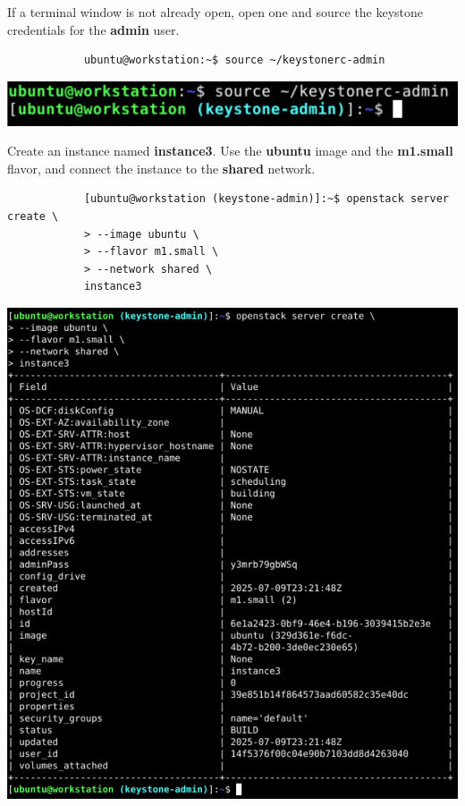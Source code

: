\documentclass[letterpaper, 12pt]{article}
\begin{document}
\begin{enumerate}
    \begin{labstep}
        If a terminal window is not already open, open one and source the keystone credentials for the \textbf{admin} user.
        \begin{lstlisting}
            ubuntu@workstation:~$ source ~/keystonerc-admin
        \end{lstlisting}

        \begin{center}
            \includegraphics[width=\linewidth]{images/part3/step1.png}
        \end{center}
    \end{labstep}

    \begin{labstep}
        Create an instance named \textbf{instance3}.
        Use the \textbf{ubuntu} image and the \textbf{m1.small} flavor, and connect the instance to the \textbf{shared} network.
        \begin{lstlisting}
            [ubuntu@workstation (keystone-admin)]:~$ openstack server create \
            > --image ubuntu \
            > --flavor m1.small \
            > --network shared \
            instance3
        \end{lstlisting}

        \begin{center}
            \includegraphics[width=\linewidth]{images/part3/step2.png}
        \end{center}
    \end{labstep}


\end{enumerate}
\end{document}
